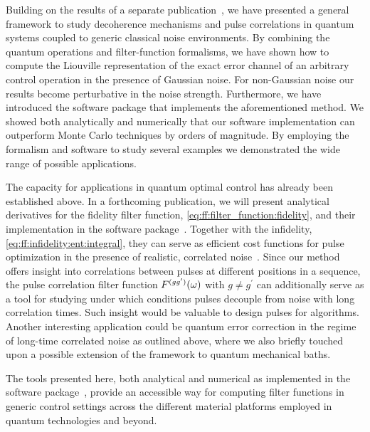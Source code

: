 Building on the results of a separate publication~\cite{Cerfontaine2021}, we have presented a general framework to study decoherence mechanisms and pulse correlations in quantum systems coupled to generic classical noise environments.
By combining the quantum operations and filter-function formalisms, we have shown how to compute the Liouville representation of the exact error channel of an arbitrary control operation in the presence of Gaussian noise.
For non-Gaussian noise our results become perturbative in the noise strength.
Furthermore, we have introduced the \filterfunctions \python software package that implements the aforementioned method.
We showed both analytically and numerically that our software implementation can outperform Monte Carlo techniques by orders of magnitude.
By employing the formalism and software to study several examples we demonstrated the wide range of possible applications.

The capacity for applications in quantum optimal control has already been established above.
In a forthcoming publication, we will present analytical derivatives for the fidelity filter function, \cref{eq:ff:filter_function:fidelity}, and their implementation in the software package~\cite{Le2022}.
Together with the infidelity, \cref{eq:ff:infidelity:ent:integral}, they can serve as efficient cost functions for pulse optimization in the presence of realistic, correlated noise~\cite{Teske2022}.
Since our method offers insight into correlations between pulses at different positions in a sequence, the pulse correlation filter function $F^{(gg^\prime)}(\omega)$ with $g\neq g^\prime$ can additionally serve as a tool for studying under which conditions pulses decouple from noise with long correlation times.
Such insight would be valuable to design pulses for algorithms.
Another interesting application could be quantum error correction in the regime of long-time correlated noise as outlined above, where we also briefly touched upon a possible extension of the framework to quantum mechanical baths.

The tools presented here, both analytical and numerical as implemented in the \filterfunctions software package~\cite{Hangleiter_ff}, provide an accessible way for computing filter functions in generic control settings across the different material platforms employed in quantum technologies and beyond.
